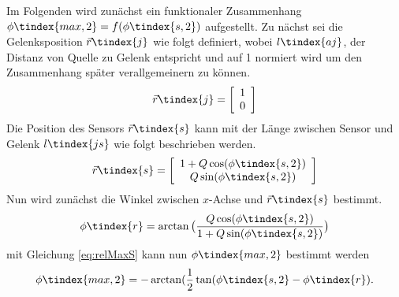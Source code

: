 Im Folgenden wird zunächst ein funktionaler Zusammenhang $\phi\tindex{max,2} = f(\phi\tindex{s,2})$ aufgestellt. Zu nächst sei die Gelenksposition $\vec{r}\tindex{j}$ wie folgt definiert, wobei $l\tindex{aj}$, der Distanz von Quelle zu Gelenk entspricht und auf 1 normiert wird um den Zusammenhang später verallgemeinern zu können.  
	\begin{equation}
		\vec{r}\tindex{j} = \left[\begin{array}{c} 1\\ 0 \end{array}\right] 
	\end{equation}
	Die Position des Sensors $\vec{r}\tindex{s}$ kann mit der Länge zwischen Sensor und Gelenk $l\tindex{js}$ wie folgt beschrieben werden.
	\begin{equation}
		\vec{r}\tindex{s} = \left[\begin{array}{c} 1+Q\cos(\phi\tindex{s,2})\\ Q\sin(\phi\tindex{s,2}) \end{array}\right] 
	\end{equation}
	Nun wird zunächst die Winkel zwischen $x$-Achse und $\vec{r}\tindex{s}$ bestimmt.
	\begin{equation}
		\phi\tindex{r} = \arctan\big(\frac{Q\cos(\phi\tindex{s,2})}{1+Q\sin(\phi\tindex{s,2})}\big)
	\end{equation}
	mit Gleichung \ref{eq:relMaxS} kann nun $\phi\tindex{max,2}$ bestimmt werden 
	\begin{equation}
		\phi\tindex{max,2} = -\arctan(\frac{1}{2} \tan(\phi\tindex{s,2} - \phi\tindex{r} ).
        \label{eq:uniqness_Value_2}
	\end{equation}
	
